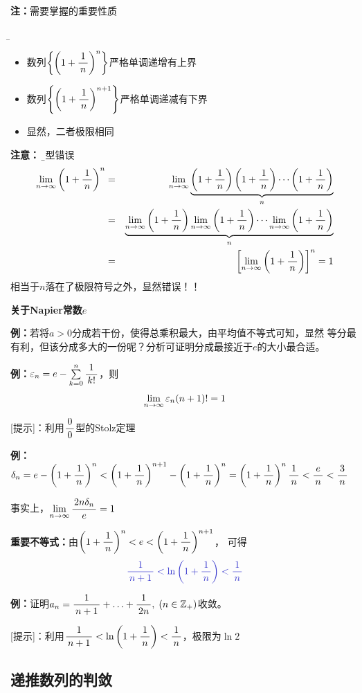{\bf 注：}需要掌握的重要性质{\b
\begin{itemize}
  \setlength{\itemindent}{1cm}
  \item 数列$\left\{\left(1+\df 1n\right)^n\right\}$严格单调递增有上界
  \item 数列$\left\{\left(1+\df 1n\right)^{n+1}\right\}$严格单调递减有下界
  \item 显然，二者极限相同
\end{itemize}}

{\bf 注意：}
{\b 典型错误
\begin{eqnarray*}
	\limn\left(1+\df1n\right)^n&
	=&\limn \underbrace{\left(1+\df 1n\right)\left(1+\df 1n\right)\cdots
	\left(1+\df	1n\right)}_{n}\\
	&=&\underbrace{\limn\left(1+\df1n\right)\limn\left(1+\df1n\right)
	\cdots\limn\left(1+\df1n\right)}_{n}\\
	&=&\left[\limn\left(1+\df1n\right)\right]^n=1
\end{eqnarray*}}
相当于$n$落在了极限符号之外，显然错误！！


\begin{shaded}
	{\bf 关于Napier常数$e$}
	
	{\bf 例：}若将$a>0$分成若干份，使得总乘积最大，由平均值不等式可知，显然
	等分最有利，但该分成多大的一份呢？分析可证明分成最接近于$e$的大小最合适。
	
	{\bf 例：}$\e_n=e-\sum\limits_{k=0}^n\df1{k!}$，则
	$$\limn\e_n(n+1)!=1$$
	
	[提示]：利用$\df00$型的Stolz定理
	
	{\bf 例：}$\delta_n=e-\left(1+\df1n\right)^n
	<\left(1+\df1n\right)^{n+1}-\left(1+\df1n\right)^n
	=\left(1+\df1n\right)^n\df1n<\df en<\df3n$
	
	事实上，$\limn\df{2n\delta_n}e=1$
	
	{\bf 重要不等式：}由{$\left(1+\df1n\right)^n<e<\left(1+\df1n\right)^{n+1}$}，
	可得
	$${\b \df1{n+1}<\ln\left(1+\df1n\right)<\df1n}$$

	{\bf 例：}证明$a_n=\df1{n+1}+\ldots+\df1{2n},\;(n\in\mathbb{Z}_+)$收敛。

	[提示]：利用$\df1{n+1}<\ln\left(1+\df1n\right)<\df1n$，极限为$\ln2$
% 	
\end{shaded}

\subsection{递推数列的判敛}

